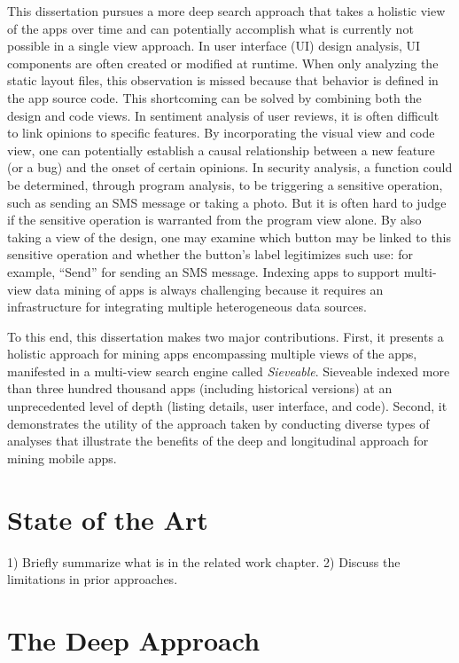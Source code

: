 This dissertation pursues a more deep search approach that takes a holistic view of the apps over time and can potentially accomplish what is currently not possible in a single view approach.
In user interface (UI) design analysis, UI components are often created or modified at runtime.
When only analyzing the static layout files, this observation is missed because that behavior is defined in the app source code.
This shortcoming can be solved by combining both the design and code views.
In sentiment analysis of user reviews, it is often difficult to link opinions to specific features.
By incorporating the visual view and code view, one can potentially establish a causal relationship between a new feature (or a bug) and the onset of certain opinions.
In security analysis, a function could be determined, through program analysis, to be triggering a sensitive operation, such as sending an SMS message or taking a photo.
But it is often hard to judge if the sensitive operation is warranted from the program view alone.
By also taking a view of the design, one may examine which button may be linked to this sensitive operation and whether the button's label legitimizes such use: for example, ``Send'' for sending an SMS message.
Indexing apps to support multi-view data mining of apps is always challenging because it requires an infrastructure for integrating multiple heterogeneous data sources.

To this end, this dissertation makes two major contributions.
First, it presents a holistic approach for mining apps encompassing multiple views of the apps, manifested in a multi-view search engine called \textit{Sieveable}.
Sieveable indexed more than three hundred thousand apps (including historical versions) at an unprecedented level of depth (listing details, user interface, and code).
Second, it demonstrates the utility of the approach taken by conducting diverse types of analyses that illustrate the benefits of the deep and longitudinal approach for mining mobile apps.

\section{State of the Art}

1) Briefly summarize what is in the related work chapter.
2) Discuss the limitations in prior approaches.
\pagebreak

\section{The Deep Approach}

